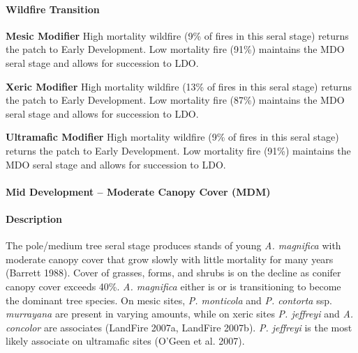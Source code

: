 \paragraph{Wildfire Transition}
\begin{adjustwidth}{2cm}{}
\noindent \textbf{Mesic Modifier } High mortality wildfire (9\% of fires in this seral stage) returns the patch to Early Development. Low mortality fire (91\%) maintains the MDO seral stage and allows for succession to LDO.

\medskip
\noindent \textbf{Xeric Modifier}  High mortality wildfire (13\% of fires in this seral stage) returns the patch to Early Development. Low mortality fire (87\%) maintains the MDO seral stage and allows for succession to LDO. 

\medskip
\noindent \textbf{Ultramafic Modifier}  High mortality wildfire (9\% of fires in this seral stage) returns the patch to Early Development. Low mortality fire (91\%) maintains the MDO seral stage and allows for succession to LDO.

\end{adjustwidth}

\noindent\hrulefill

\paragraph{Mid Development – Moderate Canopy Cover (MDM)}

\paragraph{Description} The pole/medium tree seral stage produces stands of young \emph{A. magnifica} with moderate canopy cover that grow slowly with little mortality for many years (Barrett 1988). Cover of grasses, forms, and shrubs is on the decline as conifer canopy cover exceeds 40\%. \emph{A. magnifica} either is or is transitioning to become the dominant tree species. On mesic sites, \emph{P. monticola} and \emph{P. contorta} ssp. \emph{murrayana} are present in varying amounts, while on xeric sites \emph{P. jeffreyi} and \emph{A. concolor} are associates (LandFire 2007a, LandFire 2007b). \emph{P. jeffreyi} is the most likely associate on ultramafic sites (O'Geen et al. 2007).

